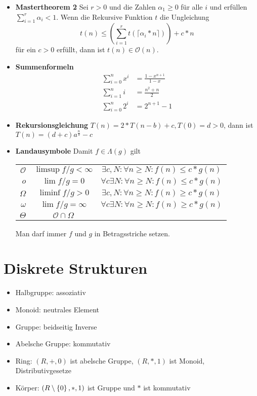 \documentclass[landscape, 8pt, a4paper]{extarticle}
\newcommand{\simpleset}[1]{\ensuremath\left\{ #1 \right\}}
\renewcommand{\O}{\mathcal O}
\begin{document}
\begin{multicols}{3}
\begin{itemize}
		\item \textbf{Mastertheorem 2} Sei $r>0$ und die Zahlen $\alpha_1\geq 0$ für alle $i$ und erfüllen $\sum_{i=1}^r\alpha_i<1$.
		Wenn die Rekursive Funktion $t$ die Ungleichung
		\begin{equation*}
			t(n)\leq \left( \sum_{i=1}^r t(\lceil \alpha_i*n\rceil) \right)+c*n
		\end{equation*}
		für ein $c>0$ erfüllt, dann ist $t(n)\in\O(n)$.

		\item \textbf{Summenformeln}
		\begin{align*}
			\sum_{i=0}^n x^i &= \frac{1-x^{n+1}}{1-x}\\
			\sum_{i=1}^n i &= \frac{n^2+n}{2}\\
			\sum_{i=0}^n 2^i&=2^{n+1}-1
		\end{align*}

		\item \textbf{Rekursionsgleichung} $T(n)=2*T(n-b)+c, T(0)=d>0$, dann ist $T(n)=(d+c)a^{\frac nb}-c$

		\item \textbf{Landausymbole} Damit $f\in \Lambda(g)$ gilt

		\begin{tabular}{r|c|c}
			$\O$&$\limsup f/g<\infty$&$\exists c,N:\forall n\geq N: f(n)\leq c*g(n)$\\
			$o$&$\lim f/g=0$&$\forall c\exists N:\forall n\geq N: f(n)\leq c*g(n)$\\
			$\Omega$&$\liminf f/g>0$&$\exists c,N:\forall n\geq N: f(n)\geq c*g(n)$\\
			$\omega$&$\lim f/g=\infty$&$\forall c\exists N:\forall n\geq N: f(n)\geq c*g(n)$\\
			$\Theta$&$\O\cap\Omega$&\\
		\end{tabular}

		Man darf immer $f$ und $g$ in Betragsstriche setzen.
	\end{itemize}



	\section{Diskrete Strukturen}
	\begin{itemize}
		\item Halbgruppe: assoziativ
		\item Monoid: neutrales Element
		\item Gruppe: beidseitig Inverse
		\item Abelsche Gruppe: kommutativ
		\item Ring: $(R,+,0)$ ist abelsche Gruppe, $(R,*,1)$ ist Monoid, Distributivgesetze
		\item Körper: $(R\setminus\simpleset 0, *,1)$ ist Gruppe und $*$ ist kommutativ


\end{itemize}
\end{multicols}
\end{document}

